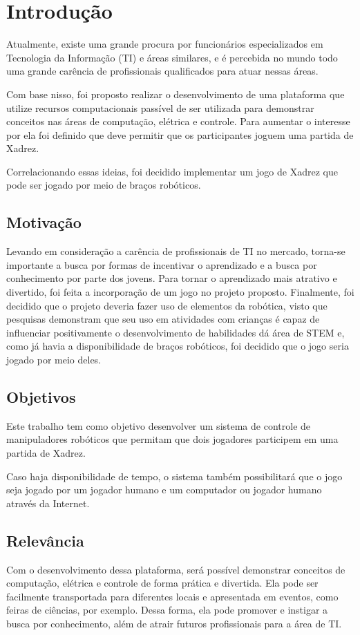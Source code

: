 \chapter[Introdução]{Introdução}
\label{cap:introducao}

Atualmente, existe uma grande procura por funcionários especializados em Tecnologia da Informação (TI) e áreas similares,
e é percebida no mundo todo uma grande carência de profissionais qualificados para atuar nessas áreas.\cite{shortage_of_workers}

Com base nisso, foi proposto realizar o desenvolvimento de uma plataforma que utilize recursos computacionais passível de ser utilizada para demonstrar conceitos nas áreas de computação, elétrica e controle.
Para aumentar o interesse por ela foi definido que deve permitir que os participantes joguem uma partida de Xadrez.

Correlacionando essas ideias, foi decidido implementar um jogo de Xadrez que pode ser jogado por meio de braços robóticos.

\section[Motivação]{Motivação}

Levando em consideração a carência de profissionais de TI no mercado, torna-se importante a busca por formas de incentivar o aprendizado e a busca por conhecimento por parte dos jovens.
Para tornar o aprendizado mais atrativo e divertido, foi feita a incorporação de um jogo no projeto proposto.
Finalmente, foi decidido que o projeto deveria fazer uso de elementos da robótica, visto que pesquisas demonstram que seu uso em atividades com crianças é capaz de influenciar positivamente o desenvolvimento de habilidades dá área de STEM\cite{technology_for_stem}
e, como já havia a disponibilidade de braços robóticos, foi decidido que o jogo seria jogado por meio deles.

\section[Objetivos]{Objetivos}

Este trabalho tem como objetivo desenvolver um sistema de controle de manipuladores robóticos que permitam que dois jogadores participem em uma partida de Xadrez.

Caso haja disponibilidade de tempo, o sistema também possibilitará que o jogo seja jogado por um jogador humano e um computador ou jogador humano através da Internet.

\section[Relevância]{Relevância}

Com o desenvolvimento dessa plataforma, será possível demonstrar conceitos de computação, elétrica e controle de forma prática e divertida.
Ela pode ser facilmente transportada para diferentes locais e apresentada em eventos, como feiras de ciências, por exemplo.
Dessa forma, ela pode promover e instigar a busca por conhecimento, além de atrair futuros profissionais para a área de TI.
